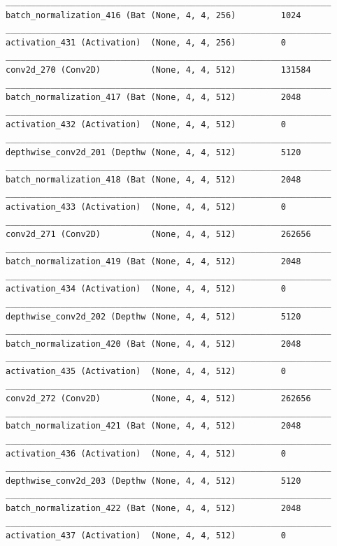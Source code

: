 \documentclass{article}
\begin{document}
\begin{appendices}
\begin{lstlisting}
_________________________________________________________________
batch_normalization_416 (Bat (None, 4, 4, 256)         1024      
_________________________________________________________________
activation_431 (Activation)  (None, 4, 4, 256)         0         
_________________________________________________________________
conv2d_270 (Conv2D)          (None, 4, 4, 512)         131584    
_________________________________________________________________
batch_normalization_417 (Bat (None, 4, 4, 512)         2048      
_________________________________________________________________
activation_432 (Activation)  (None, 4, 4, 512)         0         
_________________________________________________________________
depthwise_conv2d_201 (Depthw (None, 4, 4, 512)         5120      
_________________________________________________________________
batch_normalization_418 (Bat (None, 4, 4, 512)         2048      
_________________________________________________________________
activation_433 (Activation)  (None, 4, 4, 512)         0         
_________________________________________________________________
conv2d_271 (Conv2D)          (None, 4, 4, 512)         262656    
_________________________________________________________________
batch_normalization_419 (Bat (None, 4, 4, 512)         2048      
_________________________________________________________________
activation_434 (Activation)  (None, 4, 4, 512)         0         
_________________________________________________________________
depthwise_conv2d_202 (Depthw (None, 4, 4, 512)         5120      
_________________________________________________________________
batch_normalization_420 (Bat (None, 4, 4, 512)         2048      
_________________________________________________________________
activation_435 (Activation)  (None, 4, 4, 512)         0         
_________________________________________________________________
conv2d_272 (Conv2D)          (None, 4, 4, 512)         262656    
_________________________________________________________________
batch_normalization_421 (Bat (None, 4, 4, 512)         2048      
_________________________________________________________________
activation_436 (Activation)  (None, 4, 4, 512)         0         
_________________________________________________________________
depthwise_conv2d_203 (Depthw (None, 4, 4, 512)         5120      
_________________________________________________________________
batch_normalization_422 (Bat (None, 4, 4, 512)         2048      
_________________________________________________________________
activation_437 (Activation)  (None, 4, 4, 512)         0         

\end{lstlisting}
\end{appendices}
\end{document}
